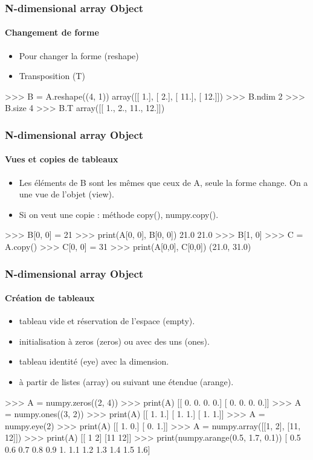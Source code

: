 \begin{frame}[fragile]
\frametitle{N-dimensional array Object}
\framesubtitle{Changement de forme}
\begin{itemize}
 \item Pour changer la forme (reshape)
 \item Transposition (T)
\end{itemize}
\begin{pythonConsole}
>>> B = A.reshape((4, 1))
array([[  1.],
       [  2.],
       [ 11.],
       [ 12.]])
>>> B.ndim
2
>>> B.size
4
>>> B.T
array([[ 1.,   2.,  11.,  12.]])
\end{pythonConsole}
\end{frame}
\begin{frame}[fragile]
\frametitle{N-dimensional array Object}
\framesubtitle{Vues et copies de tableaux}
\begin{itemize}
 \item Les éléments de B sont les mêmes que ceux de A, seule la forme change. On a une vue de l'objet (view).   
 \item Si on veut une copie : méthode copy(), numpy.copy().
\end{itemize}
\begin{pythonConsole}
>>> B[0, 0] = 21
>>> print(A[0, 0], B[0, 0])
21.0 21.0
>>> B[1, 0]
>>> C = A.copy()
>>> C[0, 0] = 31
>>> print(A[0,0], C[0,0])
(21.0, 31.0)
\end{pythonConsole}
\end{frame}
\begin{frame}[fragile]
\frametitle{N-dimensional array Object}
\framesubtitle{Création de tableaux}
\begin{itemize}
 \item tableau vide et réservation de l'espace (empty).
 \item initialisation à zeros (zeros) ou avec des uns (ones).
 \item tableau identité (eye) avec la dimension.
 \item à partir de listes (array) ou suivant une étendue (arange).
\end{itemize}
\begin{pythonConsole}
>>> A = numpy.zeros((2, 4))
>>> print(A)
[[ 0.  0.  0.  0.]
 [ 0.  0.  0.  0.]]
>>> A = numpy.ones((3, 2))
>>> print(A)
[[ 1.  1.]
 [ 1.  1.]
 [ 1.  1.]]
>>> A = numpy.eye(2)
>>> print(A)
[[ 1.  0.]
 [ 0.  1.]]
>>> A = numpy.array([[1, 2], [11, 12]])
>>> print(A)
[[ 1  2]
 [11 12]]
>>> print(numpy.arange(0.5, 1.7, 0.1))
[ 0.5  0.6  0.7  0.8  0.9  1.   1.1  1.2  1.3  1.4  1.5  1.6]
\end{pythonConsole}
\end{frame}
